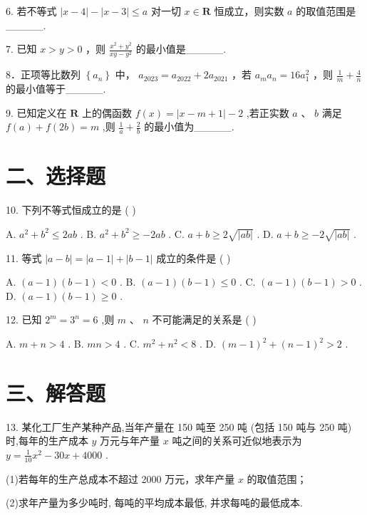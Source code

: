 6. 若不等式 $\left| {x - 4}\right|  - \left| {x - 3}\right|  \leq  a$ 对一切 $x \in  \mathbf{R}$ 恒成立，则实数 $a$ 的取值范围是\_\_\_\_\_.

7. 已知 $x > y > 0$ ，则 $\frac{{x}^{2} + {y}^{2}}{{xy} - {y}^{2}}$ 的最小值是\_\_\_\_\_.

8．正项等比数列 $\left\{  {a}_{n}\right\}$ 中， ${a}_{2023} = {a}_{2022} + 2{a}_{2021}$ ，若 ${a}_{m}{a}_{n} = {16}{a}_{1}^{2}$ ，则 $\frac{1}{m} + \frac{4}{n}$ 的最小值等于\_\_\_\_\_.

9. 已知定义在 $\mathbf{R}$ 上的偶函数 $f\left( x\right)  = \left| {x - m + 1}\right|  - 2$ ,若正实数 $a\text{ 、 }b$ 满足 $f\left( a\right)  + f\left( {2b}\right)  = m$ ,则 $\frac{1}{a} + \frac{2}{b}$ 的最小值为\_\_\_\_\_.

\section*{二、选择题}

10. 下列不等式恒成立的是 ( )

A. ${a}^{2} + {b}^{2} \leq  {2ab}$ . B. ${a}^{2} + {b}^{2} \geq   - {2ab}$ . C. $a + b \geq  2\sqrt{\left| ab\right| }$ . D. $a + b \geq   - 2\sqrt{\left| ab\right| }$ .

11. 等式 $\left| {a - b}\right|  = \left| {a - 1}\right|  + \left| {b - 1}\right|$ 成立的条件是 ( )

A. $\left( {a - 1}\right) \left( {b - 1}\right)  < 0$ . B. $\left( {a - 1}\right) \left( {b - 1}\right)  \leq  0$ . C. $\left( {a - 1}\right) \left( {b - 1}\right)  > 0$ . D. $\left( {a - 1}\right) \left( {b - 1}\right)  \geq  0$ .

12. 已知 ${2}^{m} = {3}^{n} = 6$ ,则 $m\text{ 、 }n$ 不可能满足的关系是 ( )

A. $m + n > 4$ . B. ${mn} > 4$ . C. ${m}^{2} + {n}^{2} < 8$ . D. ${\left( m - 1\right) }^{2} + {\left( n - 1\right) }^{2} > 2$ .

\section*{三、解答题}

13. 某化工厂生产某种产品,当年产量在 150 吨至 250 吨 (包括 150 吨与 250 吨) 时,每年的生产成本 $y$ 万元与年产量 $x$ 吨之间的关系可近似地表示为 $y = \frac{1}{10}{x}^{2} - {30x} + {4000}$ .

(1)若每年的生产总成本不超过 2000 万元，求年产量 $x$ 的取值范围；

(2)求年产量为多少吨时, 每吨的平均成本最低, 并求每吨的最低成本.

